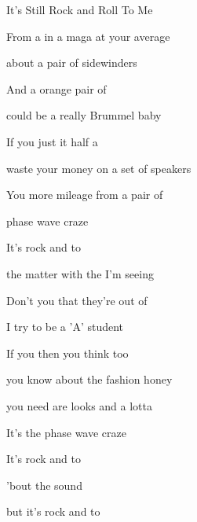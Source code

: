 \begin{SBSong}{It's Still Rock and Roll To Me}
\begin{SBVerse}
	From a  in a maga  at your average  
	
	 about a pair of  sidewinders 
	
	And a  orange pair of 
	
	 could be a really  Brummel baby 
	
	If you just  it half a 
	
	 waste your money on a  set of speakers 
	
	You  more mileage from a  pair of 
	
	 phase  wave  craze 
	
	It's  rock and  to 
  \end{SBVerse}
  \WBPageBrk
  \begin{SBVerse}
	 the matter with the  I'm seeing 
	
	Don't you  that they're out of 
	
	 I try to be a  'A' student 
	
	If you  then you think too  
	
	 you know about the  fashion honey 
	
	 you need are looks and a  lotta  
	
	It's the  phase  wave  craze  
	
	It's  rock and  to  
	
	  'bout the  sound 
	
	 but it's  rock and  to 
  \end{SBVerse}
 \end{SBSong}